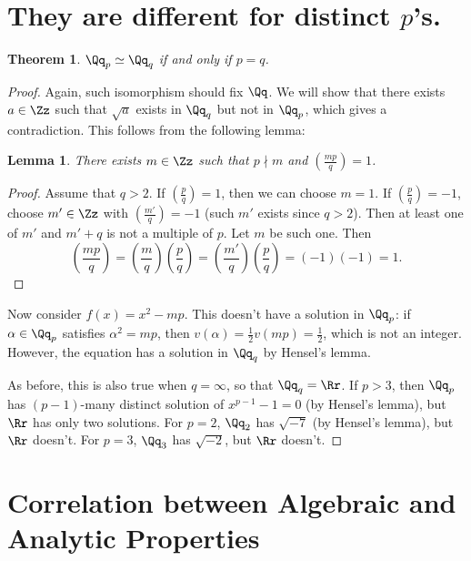 \documentclass{article}
\newtheorem{theorem}{Theorem}
\newtheorem{lemma}{Lemma}
\begin{document}
\section{They are different for distinct $p$'s.}
\begin{theorem}
$\Qq_{p} \simeq \Qq_{q}$ if and only if $p = q$. 
\end{theorem}
\begin{proof}
Again, such isomorphism should fix $\Qq$. We will show that there exists $a\in \Zz$ such that $\sqrt{a}$ exists in $\Qq_{q}$ but not in $\Qq_{p}$, which gives a contradiction. This follows from the following lemma:
\begin{lemma}
There exists $m\in \Zz$ such that $p\nmid m$ and $\left(\frac{mp}{q}\right) = 1$. 
\end{lemma}
\begin{proof}
Assume that $q>2$. If $\left(\frac{p}{q}\right) = 1$, then we can choose $m = 1$. If $\left(\frac{p}{q}\right) = -1$, choose $m'\in \Zz$ with $\left(\frac{m'}{q}\right) = -1$ (such $m'$ exists since $q >2$). 
Then at least one of $m'$ and $m'+q$ is not a multiple of $p$. 
Let $m$ be such one. Then
$$
\left(\frac{mp}{q}\right) = \left( \frac{m}{q}\right)\left(\frac{p}{q}\right) = \left(\frac{m'}{q}\right)\left(\frac{p}{q}\right) = (-1)(-1) = 1. 
$$
\end{proof}
Now consider $f(x) = x^{2} - mp$. This doesn't have a solution in $\Qq_{p}$: if $\alpha\in \Qq_{p}$ satisfies $\alpha^{2} = mp$, then $v(\alpha) = \frac{1}{2}v(mp) = \frac{1}{2}$, which is not an integer. 
However, the equation has a solution in $\Qq_{q}$ by Hensel's lemma. 

As before, this is also true when $q = \infty$, so that $\Qq_{q} = \Rr$. 
If $p>3$, then $\Qq_{p}$ has $(p-1)$-many distinct solution of $x^{p-1} - 1 = 0$ (by Hensel's lemma), but $\Rr$ has only two solutions. For $p =2$, $\Qq_{2}$ has $\sqrt{-7}$ (by Hensel's lemma), but $\Rr$ doesn't. 
For $p = 3$, $\Qq_{3}$ has $\sqrt{-2}$, but $\Rr$ doesn't. 
\end{proof}








\section{Correlation between Algebraic and Analytic Properties}
\end{document}

